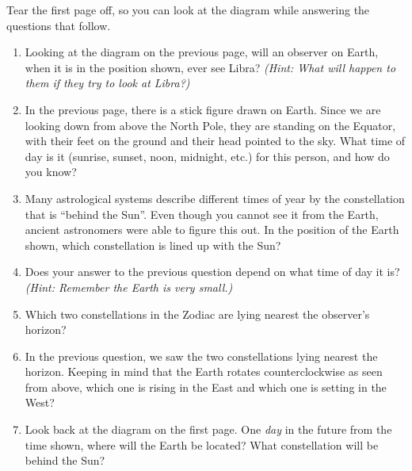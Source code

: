 \documentclass[12pt]{article}
\begin{document}
\begin{center}
	Tear the first page off, so you can look at the diagram while answering the questions that follow.
\end{center}
\newpage
\begin{enumerate}
	\item 
Looking at the diagram on the previous page, will an observer on Earth, when it is in the position shown, ever see Libra? {\it (Hint: What will happen to them if they try to look at Libra?)}

\vspace{1in}

\item In the previous page, there is a stick figure drawn on Earth. Since we are looking down from above the North Pole, they are standing on the Equator, with their feet on the ground and their head pointed to the sky. What time of day is it (sunrise, sunset, noon, midnight, etc.) for this person, and how do you know?


\vspace{1in}

\item Many astrological systems describe different times of year by the constellation that is ``behind the Sun''. Even though you cannot see it from the Earth, ancient astronomers were able to figure this out. In the position of the Earth shown, which constellation is lined up with the Sun?

\vspace{1in}

\item Does your answer to the previous question depend on what time of day it is? {\it (Hint: Remember the Earth is very small.)}

\vspace{0.5in}

\item Which two constellations in the Zodiac are lying nearest the observer's horizon?

\vspace{1in}

\item In the previous question, we saw the two constellations lying nearest the horizon. Keeping in mind that the Earth rotates counterclockwise as seen from above, which one is rising in the East and which one is setting in the West?

\newpage

\item Look back at the diagram on the first page. One {\it day} in the future from the time shown, where will the Earth be located? What constellation will be behind the Sun?


\end{enumerate}
\end{document}
